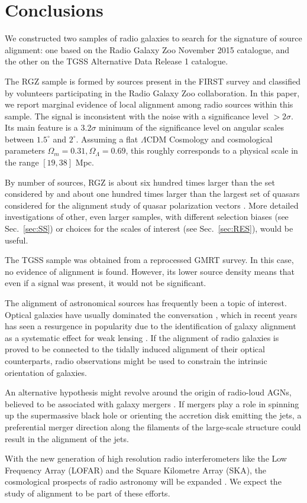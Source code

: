 \section{Conclusions}
	We constructed two samples of radio galaxies to search for the signature of source alignment: one based on the Radio Galaxy Zoo November 2015 catalogue, and the other on the TGSS Alternative Data Release 1 catalogue.
	
	The RGZ sample is formed by sources present in the FIRST survey and classified by volunteers participating in the Radio Galaxy Zoo collaboration. In this paper, we report marginal evidence of local alignment among radio sources within this sample. The signal is inconsistent with the noise  with a significance level $> 2\sigma$. Its main feature is a  $3.2\sigma$ minimum of the significance level on angular scales between $1.5^\circ$ and $2^\circ$. Assuming a flat $\Lambda$CDM Cosmology and cosmological parameters $\Omega_m=0.31, \Omega_\Lambda = 0.69$, this roughly corresponds to a physical scale in the range $[19, 38]$ Mpc.
	
	By number of sources, RGZ is about six hundred times larger than the set considered by \cite{Taylor2016} and about one hundred times larger than the largest set of quasars considered for the alignment study of quasar polarization vectors \citep{Pelgrims2014}. More detailed investigations of other, even larger samples, with different selection biases (see  Sec.~\ref{sec:SS}) or choices for the scales of interest (see Sec.~\ref{sec:RES}), would be useful.
	
	
	The TGSS sample was obtained from a reprocessed GMRT survey. In this case, no evidence of alignment is found. However, its lower source density means that even if a signal was present, it would not be significant. 
		
	The alignment of astronomical sources has frequently been a topic of interest. Optical galaxies have usually dominated the conversation \citep{Joachimi2015}, which in recent years has seen a resurgence in popularity due to the identification of galaxy alignment as a systematic effect for weak lensing \citep{Kirk2015}. If the alignment of radio galaxies is proved to be connected to the tidally induced alignment of their optical counterparts, radio observations might be used to constrain the intrinsic orientation of galaxies. 
	
	An alternative hypothesis might revolve around the origin of radio-loud AGNs, believed to be associated with galaxy mergers \citep[see, for example,][]{Hardcastle2007, Croton2006, Chiaberge2015}. If mergers play a role in spinning up the supermassive black hole or orienting the accretion disk emitting the jets, a preferential merger direction along the filaments of the large-scale structure could result in the alignment of the jets.
	
	With the new generation of high resolution radio interferometers like the Low Frequency Array (LOFAR) and the Square Kilometre Array (SKA), the cosmological prospects of radio astronomy will be expanded \citep[e.g.,][]{Blake2004a, VanHaarlem2013}. We expect the study of alignment to be part of these efforts. 
